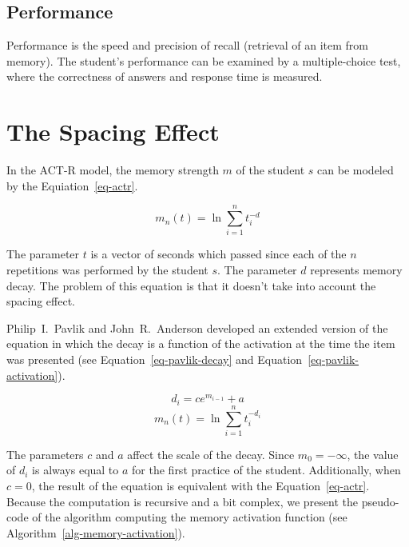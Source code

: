 \subsection{Performance}

Performance is the speed and precision of recall (retrieval of an item from memory). The student's performance can be examined by a multiple-choice test, where the correctness of answers and response time is measured.

\section{The Spacing Effect}
\label{spacing-effect}

In the ACT-R model, the memory strength $m$ of the student $s$ can be modeled by the Equiation~\ref{eq-actr}.

\begin{equation} \label{eq-actr}
  m_n(t) = \ln{\sum_{i=1}^{n} t_{i}^{-d}}
\end{equation}

The parameter $t$ is a vector of seconds which passed since each of the $n$ repetitions was performed by the student $s$. The parameter $d$ represents memory decay. The problem of this equation is that it doesn't take into account the spacing effect.


Philip~I.~Pavlik and John~R.~Anderson developed an extended version of the equation in which the decay is a function of the activation at the time the item was presented (see Equation~\ref{eq-pavlik-decay} and Equation~\ref{eq-pavlik-activation}).

\begin{equation} \label{eq-pavlik-decay}
  d_i = ce^{m_{i-1}} + a
\end{equation}
\begin{equation} \label{eq-pavlik-activation}
  m_n(t) = \ln{\sum_{i=1}^{n} t_{i}^{-d_i}}
\end{equation}

The parameters $c$ and $a$ affect the scale of the decay. Since $m_0 = -\infty$, the value of $d_i$ is always equal to $a$ for the first practice of the student. Additionally, when $c = 0$, the result of the equation is equivalent with the Equation~\ref{eq-actr}. Because the computation is recursive and a bit complex, we present the pseudo-code of the algorithm computing the memory activation function (see Algorithm~\ref{alg-memory-activation}).

